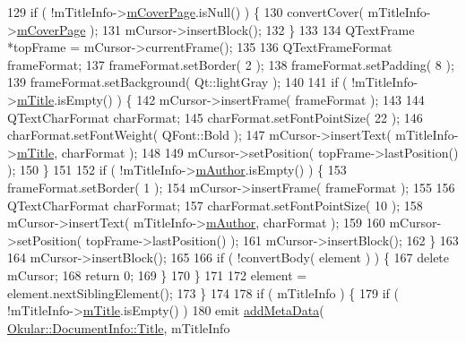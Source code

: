 \begin{DoxyCode}
129             \textcolor{keywordflow}{if} ( !mTitleInfo->\hyperlink{classConverter_1_1TitleInfo_afd5944a2140785dd5e82dd104347ea43}{mCoverPage}.isNull() ) \{
130                 convertCover( mTitleInfo->\hyperlink{classConverter_1_1TitleInfo_afd5944a2140785dd5e82dd104347ea43}{mCoverPage} );
131                 mCursor->insertBlock();
132             \}
133 
134             QTextFrame *topFrame = mCursor->currentFrame();
135 
136             QTextFrameFormat frameFormat;
137             frameFormat.setBorder( 2 );
138             frameFormat.setPadding( 8 );
139             frameFormat.setBackground( Qt::lightGray );
140 
141             \textcolor{keywordflow}{if} ( !mTitleInfo->\hyperlink{classConverter_1_1TitleInfo_a19645faf3d93e1588645fa6d50daa69a}{mTitle}.isEmpty() ) \{
142                 mCursor->insertFrame( frameFormat );
143 
144                 QTextCharFormat charFormat;
145                 charFormat.setFontPointSize( 22 );
146                 charFormat.setFontWeight( QFont::Bold );
147                 mCursor->insertText( mTitleInfo->\hyperlink{classConverter_1_1TitleInfo_a19645faf3d93e1588645fa6d50daa69a}{mTitle}, charFormat );
148 
149                 mCursor->setPosition( topFrame->lastPosition() );
150             \}
151 
152             \textcolor{keywordflow}{if} ( !mTitleInfo->\hyperlink{classConverter_1_1TitleInfo_a7ecc1a061f21392a7a3c3daa8792476c}{mAuthor}.isEmpty() ) \{
153                 frameFormat.setBorder( 1 );
154                 mCursor->insertFrame( frameFormat );
155 
156                 QTextCharFormat charFormat;
157                 charFormat.setFontPointSize( 10 );
158                 mCursor->insertText( mTitleInfo->\hyperlink{classConverter_1_1TitleInfo_a7ecc1a061f21392a7a3c3daa8792476c}{mAuthor}, charFormat );
159 
160                 mCursor->setPosition( topFrame->lastPosition() );
161                 mCursor->insertBlock();
162             \}
163 
164             mCursor->insertBlock();
165 
166             \textcolor{keywordflow}{if} ( !convertBody( element ) ) \{
167                 \textcolor{keyword}{delete} mCursor;
168                 \textcolor{keywordflow}{return} 0;
169             \}
170         \}
171 
172         element = element.nextSiblingElement();
173     \}
174 
178     \textcolor{keywordflow}{if} ( mTitleInfo ) \{
179         \textcolor{keywordflow}{if} ( !mTitleInfo->\hyperlink{classConverter_1_1TitleInfo_a19645faf3d93e1588645fa6d50daa69a}{mTitle}.isEmpty() )
180             emit \hyperlink{classOkular_1_1TextDocumentConverter_ad6e263857527273c9cf618e16329f6a7}{addMetaData}( \hyperlink{classOkular_1_1DocumentInfo_a3a6e5f7fb246e29bcb2e830b6f770791ae400626d63f14b61c55bd22aca9481e0}{Okular::DocumentInfo::Title}, mTitleInfo

\end{DoxyCode}

